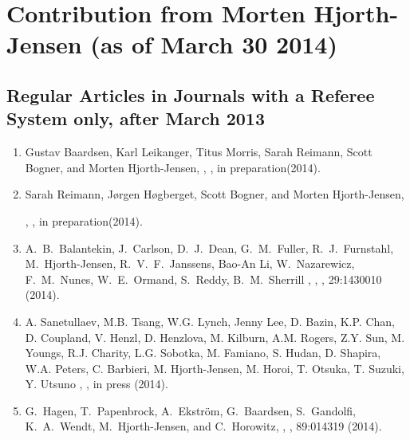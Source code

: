 \documentclass[prc,amsart,english,twocolumn,superscriptaddress,showpacs,floatfix]{revtex4}
\begin{document}
 \section*{Contribution from Morten Hjorth-Jensen (as of March 30 2014)}


 \subsection*{Regular Articles in Journals with a Referee System only, after March 2013}
 \begin{enumerate}

\item Gustav Baardsen, Karl Leikanger, Titus Morris, Sarah Reimann, Scott Bogner, and Morten Hjorth-Jensen,
, 
, in preparation(2014).


\item Sarah Reimann, J\o rgen H\o gberget, Scott Bogner, and Morten Hjorth-Jensen,

, 
, in preparation(2014).


\item A.~B.~Balantekin, J.~Carlson, D.~J.~Dean, G.~M.~Fuller, R.~J.~Furnstahl, M.~Hjorth-Jensen, R.~V.~F.~Janssens, Bao-An Li, W.~Nazarewicz, F.~M.~Nunes, W.~E.~Ormand, S.~Reddy, B.~M.~Sherrill
,
, 
, 29:1430010 (2014).


\item A. Sanetullaev, M.B. Tsang, W.G. Lynch, Jenny Lee, D. Bazin, K.P. Chan, D. Coupland, V. Henzl, D. Henzlova, M. Kilburn, A.M. Rogers, Z.Y. Sun, M. Youngs, R.J. Charity, L.G. Sobotka, M. Famiano, S. Hudan, D. Shapira, W.A. Peters, C. Barbieri, M. Hjorth-Jensen, M. Horoi, T. Otsuka, T. Suzuki, Y. Utsuno
, 
, in press (2014).


\item G.~Hagen, T.~Papenbrock,   A.~Ekstr\"om, G.~Baardsen, S.~Gandolfi, K.~A.~Wendt, M.~Hjorth-Jensen, and C.~Horowitz,
, 
,  89:014319 (2014).



\end{enumerate}
\end{document}
